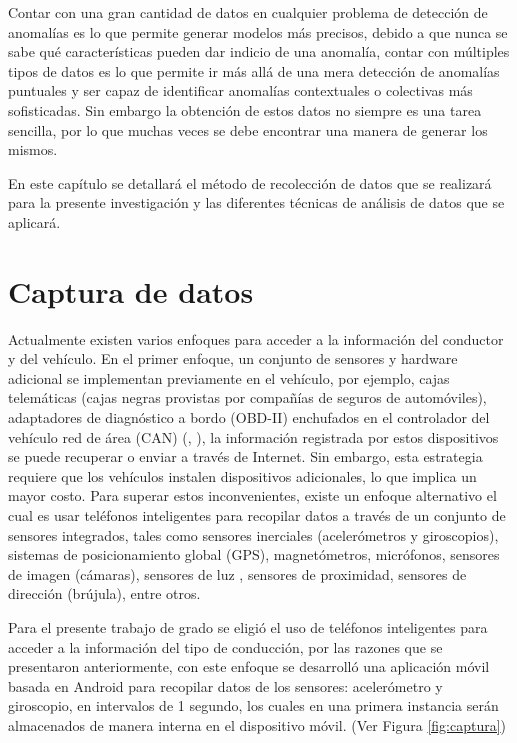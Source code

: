 Contar con una gran cantidad de datos en cualquier problema de detecci\'{o}n de anomal\'{i}as es lo que permite generar modelos m\'{a}s precisos, debido a que nunca se sabe qu\'{e} caracter\'{i}sticas pueden dar indicio de una anomal\'{i}a, contar con m\'{u}ltiples tipos de datos es lo que permite ir m\'{a}s all\'{a} de una mera detecci\'{o}n de anomal\'{i}as puntuales y ser capaz de identificar anomal\'{i}as contextuales o colectivas m\'{a}s sofisticadas. Sin embargo la obtenci\'{o}n de estos datos no siempre es una tarea sencilla, por lo que muchas veces se debe encontrar una manera de generar los mismos.

\vspace{5mm} %

En este cap\'{i}tulo se detallar\'{a} el m\'{e}todo de recolecci\'{o}n de datos que se realizar\'{a} para la presente investigaci\'{o}n y las diferentes t\'{e}cnicas de an\'{a}lisis de datos que se aplicar\'{a}.

\section{Captura de datos}

Actualmente existen varios enfoques para acceder a la información del conductor y del vehículo. En el primer enfoque, un conjunto de sensores y hardware adicional se implementan previamente en el veh\'{i}culo, por ejemplo, cajas telemáticas (cajas negras provistas por compañías de seguros de automóviles), adaptadores de diagnóstico a bordo (OBD-II) enchufados en el controlador del vehículo red de área (CAN) (\cite{30}, \cite{31}), la información registrada por estos dispositivos se puede recuperar o enviar a través de Internet. Sin embargo, esta estrategia requiere que los vehículos instalen dispositivos adicionales, lo que implica un mayor costo. Para superar estos inconvenientes, existe un enfoque alternativo el cual es usar teléfonos inteligentes para recopilar datos a través de un conjunto de sensores integrados, tales como sensores inerciales (acelerómetros y giroscopios), sistemas de posicionamiento global (GPS), magnetómetros, micrófonos, sensores de imagen (cámaras), sensores de luz , sensores de proximidad, sensores de dirección (brújula), entre otros.

\vspace{5mm} %

Para el presente trabajo de grado se eligi\'{o} el uso de tel\'{e}fonos inteligentes para acceder a la informaci\'{o}n del tipo de conducci\'{o}n, por las razones que se presentaron anteriormente, con este enfoque se desarroll\'{o} una aplicaci\'{o}n m\'{o}vil basada en Android para recopilar datos de los sensores: aceler\'{o}metro y giroscopio, en intervalos de 1 segundo, los cuales en una primera instancia ser\'{a}n almacenados de manera interna en el dispositivo m\'{o}vil. (Ver Figura \ref{fig:captura})



